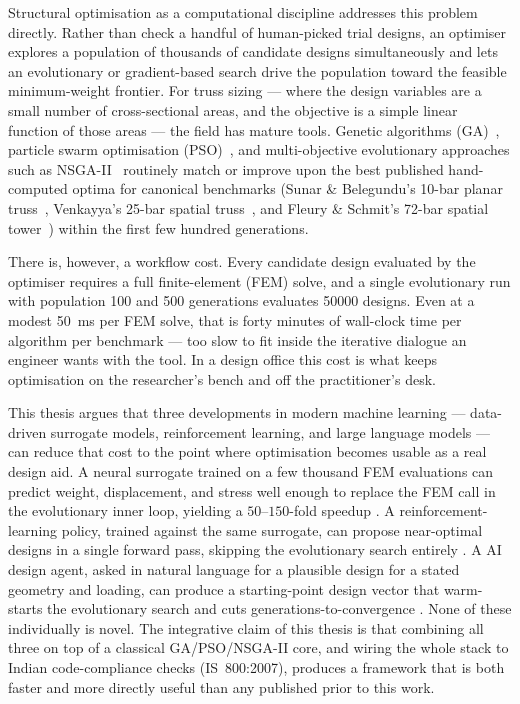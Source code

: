 Structural optimisation as a computational discipline addresses this
problem directly. Rather than check a handful of human-picked trial
designs, an optimiser explores a population of thousands of
candidate designs simultaneously and lets an evolutionary or
gradient-based search drive the population toward the feasible
minimum-weight frontier. For truss sizing — where the design
variables are a small number of cross-sectional areas, and the
objective is a simple linear function of those areas — the field
has mature tools. Genetic algorithms
(GA)~\cite{deb2001}, particle swarm optimisation
(PSO)~\cite{kennedy1995pso}, and multi-objective evolutionary
approaches such as NSGA-II~\cite{deb2002nsga2} routinely match or
improve upon the best published hand-computed optima for canonical
benchmarks (Sunar \& Belegundu's 10-bar planar
truss~\cite{sunar1991}, Venkayya's 25-bar spatial
truss~\cite{venkayya1971}, and Fleury \& Schmit's 72-bar spatial
tower~\cite{fleury1980}) within the first few hundred generations.

There is, however, a workflow cost. Every candidate design
evaluated by the optimiser requires a full finite-element (FEM)
solve, and a single evolutionary run with population
\num{100} and \num{500} generations evaluates \num{50000}
designs. Even at a modest \num{50}~ms per FEM solve, that is forty
minutes of wall-clock time per algorithm per benchmark — too slow to
fit inside the iterative dialogue an engineer wants with the tool.
In a design office this cost is what keeps optimisation on the
researcher's bench and off the practitioner's desk.

This thesis argues that three developments in modern machine learning
— data-driven surrogate models, reinforcement learning, and large
language models — can reduce that cost to the point where
optimisation becomes usable as a real design aid. A neural surrogate
trained on a few thousand FEM evaluations can predict weight,
displacement, and stress well enough to replace the FEM call in the
evolutionary inner loop, yielding a $50$--$150$-fold speedup
\cite{queipo2005,forrester2008,persia2025}. A reinforcement-learning
policy, trained against the same surrogate, can propose
near-optimal designs in a single forward pass, skipping the
evolutionary search entirely \cite{hayashi2020rl,brown2022rl}.
A AI design agent, asked in natural language for a plausible
design for a stated geometry and loading, can produce a
starting-point design vector that warm-starts the
evolutionary search and cuts generations-to-convergence
\cite{geng2024,makatura2024}. None of these individually is novel.
The integrative claim of this thesis is that combining all three on
top of a classical GA/PSO/NSGA-II core, and wiring the whole stack
to Indian code-compliance checks (IS~800:2007), produces a framework
that is both faster and more directly useful than any published
prior to this work.

